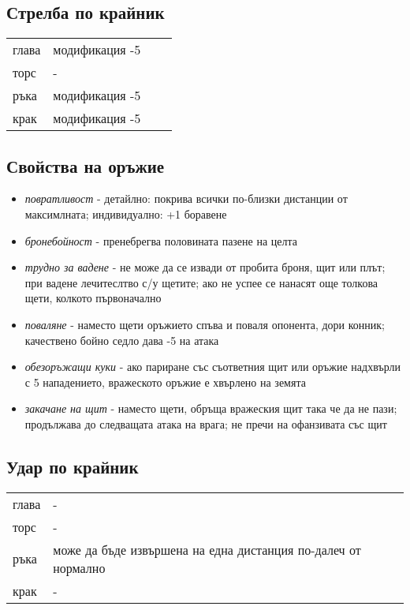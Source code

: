 \begin{footnotesize}
\begin{multicols}{2}
\subsection{Стрелба по крайник}
\begin{tabular}{l | l | l | l }
глава & модификация -5  \\
торс  & -  \\
ръка & модификация -5  \\
крак & модификация -5  \\
\end{tabular}


\subsection{Свойства на оръжие}
\begin{itemize}
\item{\textit{повратливост} - детайлно: покрива всички по-близки дистанции от максимлната; индивидуално: +1 боравене }
\item{\textit{бронебойност} - пренебрегва половината пазене на целта}
\item{\textit{трудно за вадене} - не може да се извади от пробита броня, щит или плът; при вадене лечитеслтво с/у щетите; ако не успее се  нанасят още толкова щети, колкото първоначално}
\item{\textit{поваляне} - наместо щети оръжието спъва и поваля опонента, дори конник; качествено бойно седло дава -5 на атака}
\item{\textit{обезоръжащи куки} - ако париране със съответния щит или оръжие надхвърли с 5 нападението, вражеското оръжие е хвърлено на земята}
\item{\textit{закачане на щит} - наместо щети, обръща вражеския щит така че да не пази; продължава до следващата атака на врага; не пречи на офанзивата със щит}
\end{itemize}


\subsection{Удар по крайник}
\begin{tabular}{l | l | l | l }
глава & -  \\
торс  & -  \\
ръка  & може да бъде извършена на една дистанция по-далеч от нормално  \\
крак  & -  \\
\end{tabular}



\end{multicols}
\end{footnotesize}
